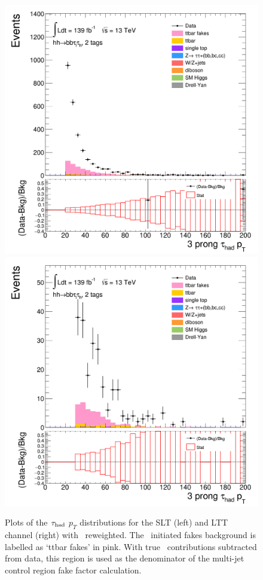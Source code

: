\begin{figure}
\centering
\includegraphics[width=.45\textwidth]{DiHiggs/plots/FF_CRs/InvCR_SLT/HNone/BDTVarsHighMbb/2/C_2tag2pjet_0ptv_TauPt3P.png}
\includegraphics[width=.45\textwidth]{DiHiggs/plots/FF_CRs/InvCR_LTT/HNone/BDTVarsHighMbb/2/C_2tag2pjet_0ptv_TauPt3P.png}\\
\caption{Plots of the $\tau_{\mathrm{had}}$ $p_T$ distributions for the SLT (left) and LTT channel (right) with \ttbar\ reweighted.
The \ttbar\ initiated fakes background is labelled as `ttbar fakes' in pink.
With true \tauhad\ contributions subtracted from data, 
this region is used as the denominator of the multi-jet control region fake factor calculation.}
\label{fig:InvCR_3}
\end{figure} 

